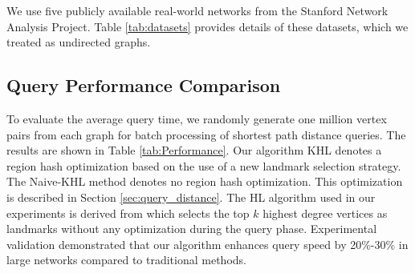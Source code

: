 \documentclass[sigconf]{acmart}
\begin{document}
\begin{table}[h]
\centering
\caption{Datasets}
\label{tab:datasets}
\end{table}

We use five publicly available real-world networks from the Stanford Network Analysis Project\cite{ref14}. Table \ref{tab:datasets} provides details of these datasets, which we treated as undirected graphs.
\subsection{Query Performance Comparison}

\begin{table}[!htbp]
\caption{Random vertex pair shortest distance batch query}
\label{tab:Performance}
\centering
\renewcommand\arraystretch{1.2}
\end{table}
%
%
To evaluate the average query time, we randomly generate one million vertex pairs from each graph for batch processing of shortest path distance queries. The results are shown in Table \ref{tab:Performance}. Our algorithm KHL denotes a region hash optimization based on the use of a new landmark selection strategy. The Naive-KHL method denotes no region hash optimization. This optimization is described in Section \ref{sec:query_distance}. The HL algorithm used in our experiments is derived from\cite{ref7} which selects the top $k$ highest degree vertices as landmarks without any optimization during the query phase. Experimental validation demonstrated that our algorithm enhances query speed by 20\%-30\% in large networks compared to traditional methods.\par
%
%
\end{document}
